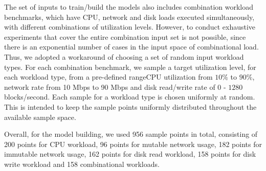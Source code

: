 % 
% 


The set of inputs to train/build the models also includes 
combination workload benchmarks, which have CPU, network and disk
loads executed simultaneously, with different combinations of 
utilization levels.
However, to conduct exhaustive experiments that cover the
entire combination input set is not possible, since there is an
exponential number of cases in the input space of combinational load.
Thus, we adopted a workaround of choosing a set of random input 
workload types. 
For each combination benchmark, we sample a target utilization level, for 
each workload type, from a pre-defined range\textemdash{}CPU utilization from $10\%$ to 
$90\%$, network rate from 10 Mbps to 90 Mbps and disk read/write rate
of $0$ - $1280$ blocks/second. Each sample for a workload type is chosen
uniformly at random. 
This is intended to keep the sample points
uniformly distributed throughout the available sample space. 

Overall, for the model building, we used 956 sample points in total, consisting
of 200 points for CPU workload, 96 points for mutable network usage, 182 points
for immutable network usage, 162 points for disk read workload, 158 points for disk write 
workload and 158 combinational workloads.



